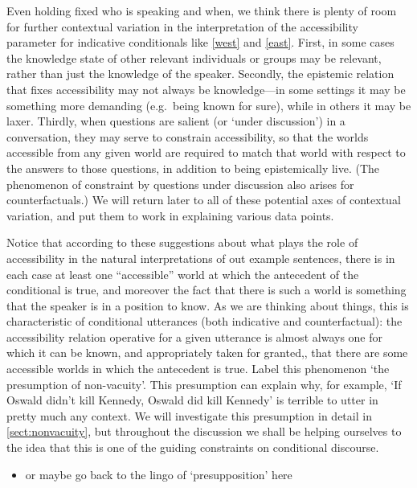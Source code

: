 \documentclass[If.tex]{subfiles}
\begin{document}
Even holding fixed who is speaking and when, we think there is plenty of room for further contextual variation in the interpretation of the accessibility parameter for indicative conditionals like \ref{west} and \ref{east}.  First, in some cases the knowledge state of other relevant individuals or groups may be relevant, rather than just the knowledge of the speaker.  Secondly, the epistemic relation that fixes accessibility may not always be knowledge---in some settings it may be something more demanding (e.g.\ being known for sure), while in others it may be laxer.   Thirdly, when questions are salient (or ‘under discussion’) in a conversation, they may serve to constrain accessibility, so that the worlds accessible from any given world are required to match that world with respect to the answers to those questions, in addition to being epistemically live.  (The phenomenon of constraint by questions under discussion also arises for counterfactuals.)  We will return later to all of these potential axes of contextual variation, and put them to work in explaining various data points.  

Notice that according to these suggestions about what plays the role of accessibility in the natural interpretations of out example sentences, there is in each case at least one “accessible” world at which the antecedent of the conditional is true, and moreover the fact that there is such a world is something that the speaker is in a position to know. As we are thinking about things, this is characteristic of conditional utterances (both indicative and counterfactual): the accessibility relation operative for a given utterance is almost always one for which it can be known, and appropriately taken for granted,, that there are some accessible worlds in which the antecedent is true. Label this phenomenon ‘the presumption of non-vacuity’.  This presumption can explain why, for example, ‘If Oswald didn't kill Kennedy, Oswald did kill Kennedy’ is terrible to utter in pretty much any context.  We will investigate this presumption in detail in \autoref{sect:nonvacuity}, but throughout the discussion we shall be helping ourselves to the idea that this is one of the guiding constraints on conditional discourse.
\begin{itemize} 
	\item
	or maybe go back to the lingo of ‘presupposition’ here
\end{itemize}
\end{document}
